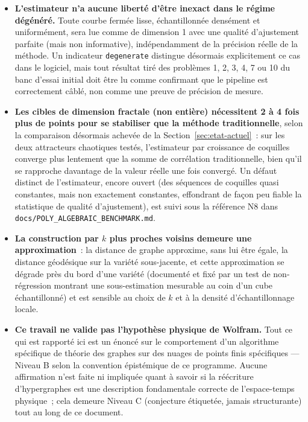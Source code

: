 \documentclass[11pt,a4paper]{article}
\begin{document}
\begin{itemize}
\item \textbf{L'estimateur n'a aucune liberté d'être inexact dans le
  régime dégénéré.} Toute courbe fermée lisse, échantillonnée densément
  et uniformément, sera lue comme de dimension 1 avec une qualité
  d'ajustement parfaite (mais non informative), indépendamment de la
  précision réelle de la méthode. Un indicateur \texttt{degenerate}
  distingue désormais explicitement ce cas dans le logiciel, mais tout
  résultat tiré des problèmes 1, 2, 3, 4, 7 ou 10 du banc d'essai initial
  doit être lu comme confirmant que le pipeline est correctement câblé,
  non comme une preuve de précision de mesure.
\item \textbf{Les cibles de dimension fractale (non entière) nécessitent
  2 à 4 fois plus de points pour se stabiliser que la méthode
  traditionnelle}, selon la comparaison désormais achevée de la
  Section~\ref{sec:etat-actuel}~: sur les deux attracteurs chaotiques
  testés, l'estimateur par croissance de coquilles converge plus
  lentement que la somme de corrélation traditionnelle, bien qu'il se
  rapproche davantage de la valeur réelle une fois convergé. Un défaut
  distinct de l'estimateur, encore ouvert (des séquences de coquilles
  quasi constantes, mais non exactement constantes, effondrant de façon
  peu fiable la statistique de qualité d'ajustement), est suivi sous la
  référence N8 dans \texttt{docs/POLY\_ALGEBRAIC\_BENCHMARK.md}.
\item \textbf{La construction par $k$ plus proches voisins demeure une
  approximation}~: la distance de graphe approxime, sans lui être égale,
  la distance géodésique sur la variété sous-jacente, et cette
  approximation se dégrade près du bord d'une variété (documenté et fixé
  par un test de non-régression montrant une sous-estimation mesurable au
  coin d'un cube échantillonné) et est sensible au choix de $k$ et à la
  densité d'échantillonnage locale.
\item \textbf{Ce travail ne valide pas l'hypothèse physique de Wolfram.}
  Tout ce qui est rapporté ici est un énoncé sur le comportement d'un
  algorithme spécifique de théorie des graphes sur des nuages de points
  finis spécifiques --- Niveau B selon la convention épistémique de ce
  programme. Aucune affirmation n'est faite ni impliquée quant à savoir si
  la réécriture d'hypergraphes est une description fondamentale correcte
  de l'espace-temps physique~; cela demeure Niveau C (conjecture étiquetée,
  jamais structurante) tout au long de ce document.
\end{itemize}
\end{document}

